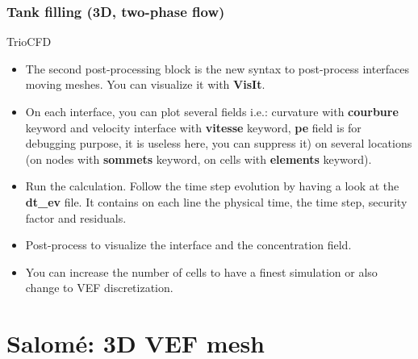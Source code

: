 \documentclass[10pt, hyperref={unicode=true,pdfusetitle, bookmarks=true,bookmarksnumbered=false,bookmarksopen=false, breaklinks=false,pdfborder={0 0 1},backref=true,colorlinks=true,linkcolor=darkblue,pageanchor}]{beamer}
\begin{document}
\begin{frame}
\frametitle{Tank filling (3D, two-phase flow)}
\begin{block}{TrioCFD}

\begin{itemize}
\item The second post-processing block is the new syntax to post-process interfaces moving meshes. You can visualize it with \textbf{VisIt}. 

\item On each interface, you can plot several fields i.e.: curvature with \textbf{courbure} keyword and velocity interface with \textbf{vitesse} keyword, \textbf{pe} field is for debugging purpose, it is useless here, you can suppress it) on several locations (on nodes with \textbf{sommets} keyword, on cells with \textbf{elements} keyword).

\item Run the calculation. Follow the time step evolution by having a look at the \textbf{dt\_ev} file. It contains on each line the physical time, the time step, security factor and residuals.

\item Post-process to visualize the interface and the concentration field.

\item You can increase the number of cells to have a finest simulation or also change to VEF discretization.

\end{itemize}

\end{block}
\end{frame}



\section{{\bf{Salom\'e: 3D VEF mesh}}} \label{salome}
\end{document}
